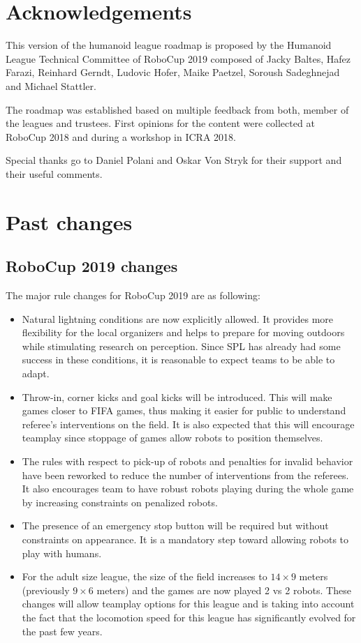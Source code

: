 \documentclass{article}
\begin{document}
\section*{Acknowledgements}
This version of the humanoid league roadmap is proposed by the Humanoid League
Technical Committee of RoboCup 2019 composed of Jacky Baltes, Hafez Farazi,
Reinhard Gerndt, Ludovic Hofer, Maike Paetzel, Soroush Sadeghnejad and Michael
Stattler.

The roadmap was established based on multiple feedback from both, member of the
leagues and trustees. First opinions for the content were collected at RoboCup
2018 and during a workshop in ICRA 2018.

Special thanks go to Daniel Polani and Oskar Von Stryk for their support and
their useful comments.

\appendix

\section{Past changes}

\subsection{RoboCup 2019 changes}

The major rule changes for RoboCup 2019 are as following:

\begin{itemize}
\item Natural lightning conditions are now explicitly allowed.
  It provides more flexibility for the local organizers and
  helps to prepare for moving outdoors while stimulating research on perception.
  Since SPL has already had some success in these conditions,
  it is reasonable to expect teams to be able to adapt.
\item Throw-in, corner kicks and goal kicks will be introduced.
  This will make games closer to FIFA games,
  thus making it easier for public to understand referee's interventions on the field.
  It is also expected that this will encourage teamplay since stoppage of games
  allow robots to position themselves.
\item The rules with respect to pick-up of robots and penalties for invalid
  behavior have been reworked to reduce the number of interventions from the referees.
  It also encourages team to have robust robots playing during the whole game by
  increasing constraints on penalized robots.
\item The presence of an emergency stop button will be required but without
  constraints on appearance.
  It is a mandatory step toward allowing robots to play with humans.
\item For the adult size league, the size of the field increases to
  $14 \times 9$ meters (previously $9 \times 6$ meters)
  and the games are now played 2 vs 2 robots.
  These changes will allow teamplay options for this league and is taking into
  account the fact that the locomotion speed for this league has significantly
  evolved for the past few years.
\end{itemize}
\end{document}
